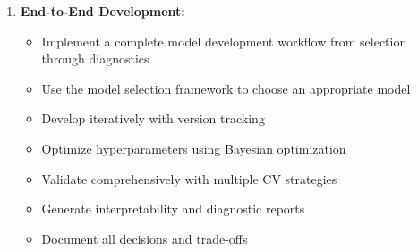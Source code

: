 \begin{enumerate}
    \item \textbf{End-to-End Development:}
    \begin{itemize}
        \item Implement a complete model development workflow from selection through diagnostics
        \item Use the model selection framework to choose an appropriate model
        \item Develop iteratively with version tracking
        \item Optimize hyperparameters using Bayesian optimization
        \item Validate comprehensively with multiple CV strategies
        \item Generate interpretability and diagnostic reports
        \item Document all decisions and trade-offs
    \end{itemize}
\end{enumerate}
